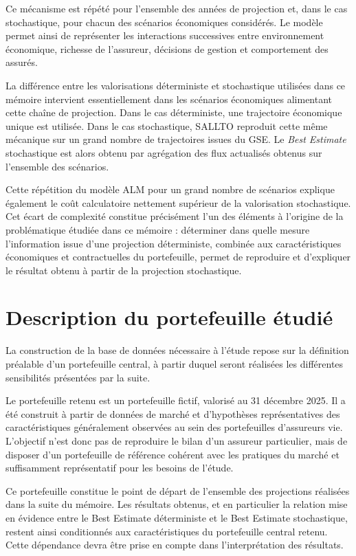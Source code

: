 Ce mécanisme est répété pour l'ensemble des années de projection et, dans le cas stochastique, pour chacun des scénarios économiques considérés. Le modèle permet ainsi de représenter les interactions successives entre environnement économique, richesse de l'assureur, décisions de gestion et comportement des assurés.

La différence entre les valorisations déterministe et stochastique utilisées dans ce mémoire intervient essentiellement dans les scénarios économiques alimentant cette chaîne de projection. Dans le cas déterministe, une trajectoire économique unique est utilisée. Dans le cas stochastique, SALLTO reproduit cette même mécanique sur un grand nombre de trajectoires issues du GSE. Le \textit{Best Estimate} stochastique est alors obtenu par agrégation des flux actualisés obtenus sur l'ensemble des scénarios.

Cette répétition du modèle ALM pour un grand nombre de scénarios explique également le coût calculatoire nettement supérieur de la valorisation stochastique. Cet écart de complexité constitue précisément l'un des éléments à l'origine de la problématique étudiée dans ce mémoire : déterminer dans quelle mesure l'information issue d'une projection déterministe, combinée aux caractéristiques économiques et contractuelles du portefeuille, permet de reproduire et d'expliquer le résultat obtenu à partir de la projection stochastique.


\section{Description du portefeuille étudié}


La construction de la base de données nécessaire à l'étude repose sur la définition préalable d'un portefeuille central, à partir duquel seront réalisées les différentes sensibilités présentées par la suite.

Le portefeuille retenu est un portefeuille fictif, valorisé au 31 décembre 2025. Il a été construit à partir de données de marché et d'hypothèses représentatives des caractéristiques généralement observées au sein des portefeuilles d'assureurs vie. L'objectif n'est donc pas de reproduire le bilan d'un assureur particulier, mais de disposer d'un portefeuille de référence cohérent avec les pratiques du marché et suffisamment représentatif pour les besoins de l'étude.

Ce portefeuille constitue le point de départ de l'ensemble des projections réalisées dans la suite du mémoire. Les résultats obtenus, et en particulier la relation mise en évidence entre le Best Estimate déterministe et le Best Estimate stochastique, restent ainsi conditionnés aux caractéristiques du portefeuille central retenu. Cette dépendance devra être prise en compte dans l'interprétation des résultats.

